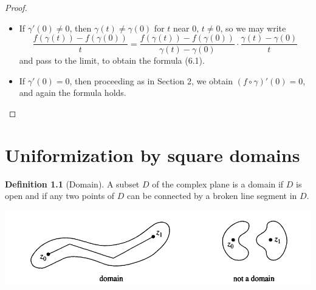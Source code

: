 \documentclass[
]{book}
\providecommand{\tightlist}{%
  \setlength{\itemsep}{0pt}\setlength{\parskip}{0pt}}
\theoremstyle{definition}
\newtheorem{definition}{Definition}[chapter]
\theoremstyle{definition}
\theoremstyle{definition}
\theoremstyle{definition}
\theoremstyle{remark}
\begin{document}
\begin{proof}
\leavevmode

\begin{itemize}
\tightlist
\item
  If \(\gamma'(0) \neq 0\), then \(\gamma(t) \neq \gamma(0)\) for \(t\) near \(0\), \(t \neq 0\), so we may write
  \begin{equation}
  \frac{f(\gamma(t)) - f(\gamma(0))}{t} = \frac{f(\gamma(t)) - f(\gamma(0))}{\gamma(t) - \gamma(0)} \cdot \frac{\gamma(t) - \gamma(0)}{t}
  \end{equation}
  and pass to the limit, to obtain the formula (6.1).
\item
  If \(\gamma'(0) = 0\), then proceeding as in Section 2, we obtain \((f \circ \gamma)'(0) = 0\), and again the formula holds.
\end{itemize}

\end{proof}

\chapter{Uniformization by square domains}\label{uniformization-by-square-domains}

\begin{definition}[Domain]
\protect\hypertarget{def:unnamed-chunk-19}{}\label{def:unnamed-chunk-19}A subset \(D\) of the complex plane is a domain if \(D\) is open and if any two points of \(D\) can be connected by a broken line segment in \(D\).
\end{definition}

\includegraphics{figures/Mario_Bonk/fig1.png}
\end{document}
